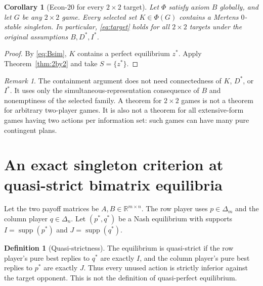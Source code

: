 \documentclass[11pt]{article}
\newcommand{\supp}{\operatorname{supp}}
\newcommand{\R}{\mathbb R}
\newtheorem{corollary}[theorem]{Corollary}
\theoremstyle{definition}
\newtheorem{definition}[theorem]{Definition}
\theoremstyle{remark}
\newtheorem{remark}[theorem]{Remark}
\begin{document}
\begin{corollary}[Econ-20 for every $2\times2$ target]\label{cor:axioms2by2}
Let $\Phi$ satisfy axiom $B$ globally, and let $G$ be any $2\times2$ game.
Every selected set $K\in\Phi(G)$ contains a Mertens $0$-stable singleton.
In particular, \eqref{eq:target} holds for all $2\times2$ targets under the
original assumptions $B,D^*,I^*$.
\end{corollary}
\begin{proof}
By \eqref{eq:Bsim}, $K$ contains a perfect equilibrium $z^*$. Apply
Theorem~\ref{thm:2by2} and take $S=\{z^*\}$.
\end{proof}

\begin{remark}
The containment argument does not need connectedness of $K$, $D^*$, or $I^*$.
It uses only the simultaneous-representation consequence of $B$ and
nonemptiness of the selected family. A theorem for $2\times2$ games is not a
theorem for arbitrary two-player games. It is also not a theorem for all
extensive-form games having two actions per information set: such games can
have many pure contingent plans.
\end{remark}


\section{An exact singleton criterion at quasi-strict bimatrix equilibria}
Let the two payoff matrices be $A,B\in\R^{m\times n}$. The row player uses
$p\in\Delta_m$ and the column player $q\in\Delta_n$. Let $(p^*,q^*)$ be a
Nash equilibrium with supports $I=\supp(p^*)$ and $J=\supp(q^*)$.

\begin{definition}[Quasi-strictness]
The equilibrium is quasi-strict if the row player's pure best replies to
$q^*$ are exactly $I$, and the column player's pure best replies to $p^*$
are exactly $J$. Thus every unused action is strictly inferior against the
target opponent. This is not the definition of quasi-perfect equilibrium.
\end{definition}
\end{document}
